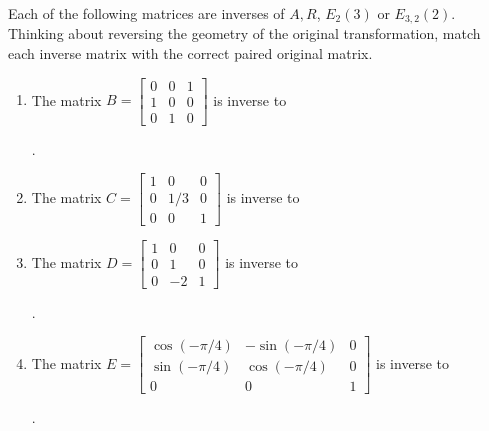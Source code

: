 \documentclass{ximera}
\begin{document}
\begin{exploration}
  Each of the following matrices are inverses of $A, R$, $E_{2}(3)$ or $E_{3,2}(2)$. Thinking about reversing the geometry of the original transformation, match each inverse matrix with the correct paired original matrix.

  \begin{enumerate}
    \item The matrix $B=\begin{bmatrix}
      0&0&1\\1&0&0\\0&1&0
    \end{bmatrix}$ is inverse to \begin{multipleChoice}
    \end{multipleChoice}.
    
    \item The matrix $C=\begin{bmatrix}
    1&0&0\\0&1/3&0\\0&0&1
    \end{bmatrix}$ is inverse to \begin{multipleChoice}
      \end{multipleChoice}

    \item The matrix $D=\begin{bmatrix}
      1 & 0 & 0 \\
      0 & 1 & 0 \\
      0 & -2 & 1
    \end{bmatrix}$ is inverse to \begin{multipleChoice}
      \end{multipleChoice}.

    \item The matrix $E=\begin{bmatrix}
      \cos(-\pi/4) & -\sin(-\pi/4) & 0\\
      \sin(-\pi/4) & \cos(-\pi/4) & 0\\
      0&0&1
    \end{bmatrix}$ is inverse to \begin{multipleChoice}
      \end{multipleChoice}.
  \end{enumerate}


\end{exploration}
\end{document}
